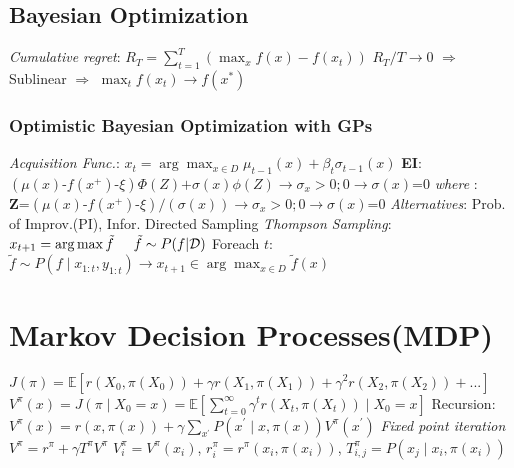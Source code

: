 \documentclass[a4paper, 11pt, landscape]{article}
\begin{document}
\begin{multicols*}{3}
\subsection{Bayesian Optimization}
\textit{Cumulative regret}: $R_{T}=\sum_{t=1}^{T}\left(\max _{x} f(x)-f\left(x_{t}\right)\right)$
\newline $R_T/T\rightarrow 0$ $\Rightarrow$ Sublinear $\Rightarrow$ $\max _{t} f\left(x_{t}\right) \rightarrow f\left(x^{*}\right)$

\subsubsection{Optimistic Bayesian Optimization with GPs}
\textit{Acquisition Func.}: $x_{t}=\arg \max _{x \in D} \mu_{t-1}(x)+\beta_{t} \sigma_{t-1}(x)$
\newline\textbf{EI}: $\left(\mu(x)\text{-}f(x^\text{+})\text{-}\xi \right)\Phi(Z)\text{+}\sigma(x)\phi(Z) \to \sigma_x > 0; 0 \to \sigma(x) \text{=} 0$
\newline \textit{where} : $\textbf{Z}\text{=}(\mu(x)\text{-}f(x^\text{+})\text{-}\xi)/(\sigma(x))\to\sigma_x > 0; 0\to\sigma(x)\text{=}0$
\newline \textit{Alternatives}: Prob. of Improv.(PI), Infor. Directed Sampling
\newline \textit{Thompson Sampling}: $x_{t+1} = \arg \max \tilde{f} \hspace{0.5cm}\tilde{f} \sim P(f|\mathcal D)$
\newline Foreach $t$: $\tilde{f} \sim P\left(f \mid x_{1: t}, y_{1: t}\right) \rightarrow x_{t+1} \in \arg \max _{x \in D} \tilde{f}(x)$

\section{Markov Decision Processes(MDP)}
$J(\pi) = \mathbb{E}[r(X_0,\pi(X_0))+\gamma r(X_1,\pi(X_1)) + \gamma^2 r(X_2,\pi(X_2)) + ...]$
\newline $V^{\pi}(x)=J\left(\pi \mid X_{0}=x\right)=\mathbb{E}\left[\sum_{t=0}^{\infty} \gamma^{t} r\left(X_{t}, \pi\left(X_{t}\right)\right) \mid X_{0}=x\right]$
\newline Recursion: $V^{\pi}(x)=r(x, \pi(x))+\gamma \sum_{x^{\prime}} P\left(x^{\prime} \mid x, \pi(x)\right) V^{\pi}\left(x^{\prime}\right)$
\newline \textit{Fixed point iteration} $V^{\pi} = r^{\pi} + \gamma T^{\pi} V^{\pi}$
\newline $V^{\pi}_i = V^{\pi}(x_i)$, $r^{\pi}_i = r^{\pi}(x_i,\pi(x_i))$, $T^{\pi}_{i,j} = P\left(x_j \mid x_i, \pi(x_i)\right)$


\end{multicols*}
\end{document}
